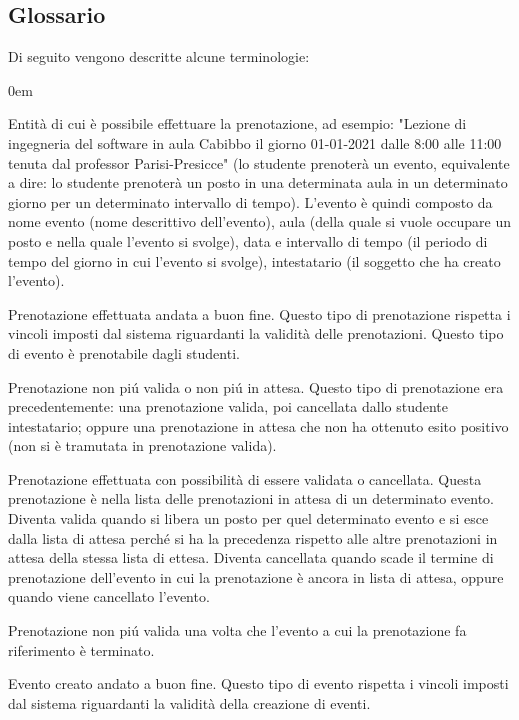 \documentclass[11pt]{article}
\begin{document}
\subsection{Glossario}
Di seguito vengono descritte alcune terminologie:
\begin{description}
\addtolength{\itemindent}{0.5cm}
\itemsep0em
\item [Evento] Entità di cui è possibile effettuare la prenotazione, ad esempio: "Lezione di ingegneria del software in aula Cabibbo il giorno 01-01-2021 dalle 8:00 alle 11:00 tenuta dal professor Parisi-Presicce" (lo studente prenoterà un evento, equivalente a dire: lo studente prenoterà un posto in una determinata aula in un determinato giorno per un determinato intervallo di tempo). L'evento è quindi composto da nome evento (nome descrittivo dell'evento), aula (della quale si vuole occupare un posto e nella quale l'evento si svolge), data e intervallo di tempo (il periodo di tempo del giorno in cui l'evento si svolge), intestatario (il soggetto che ha creato l'evento).
\item [Prenotazione valida] Prenotazione effettuata andata a buon fine. Questo tipo di prenotazione rispetta i vincoli imposti dal sistema riguardanti la validità delle prenotazioni. Questo tipo di evento è prenotabile dagli studenti.
\item [Prenotazione cancellata] Prenotazione non piú valida o non piú in attesa. Questo tipo di prenotazione era precedentemente: una prenotazione valida, poi cancellata dallo studente intestatario; oppure una prenotazione in attesa che non ha ottenuto esito positivo (non si è tramutata in prenotazione valida).
\item [Prenotazione in attesa] Prenotazione effettuata con possibilità di essere validata o cancellata. Questa prenotazione è nella lista delle prenotazioni in attesa di un determinato evento. Diventa valida quando si libera un posto per quel determinato evento e si esce dalla lista di attesa perché si ha la precedenza rispetto alle altre prenotazioni in attesa della stessa lista di ettesa. Diventa cancellata quando scade il termine di prenotazione dell'evento in cui la prenotazione è ancora in lista di attesa, oppure quando viene cancellato l'evento.
\item [Prenotazione scaduta] Prenotazione non piú valida una volta che l'evento a cui la prenotazione fa riferimento è terminato.
\item [Evento valido] Evento creato andato a buon fine. Questo tipo di evento rispetta i vincoli imposti dal sistema riguardanti la validità della creazione di eventi.

\end{description}
\end{document}
